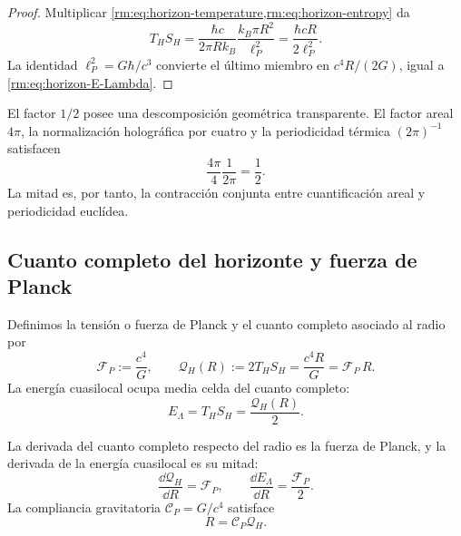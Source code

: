 \begin{proof}
Multiplicar \cref{rm:eq:horizon-temperature,rm:eq:horizon-entropy} da
\[
 T_HS_H
 =\frac{\hbar c}{2\pi Rk_B}
  \frac{k_B\pi R^2}{\ell_P^2}
 =\frac{\hbar cR}{2\ell_P^2}.
\]
La identidad \(\ell_P^2=G\hbar/c^3\) convierte el \'ultimo miembro en
\(c^4R/(2G)\), igual a \cref{rm:eq:horizon-E-Lambda}.
\end{proof}

El factor \(1/2\) posee una descomposici\'on geom\'etrica transparente. El
factor areal \(4\pi\), la normalizaci\'on hologr\'afica por cuatro y la
periodicidad t\'ermica \((2\pi)^{-1}\) satisfacen
\begin{equation}
 \frac{4\pi}{4}\frac1{2\pi}=\frac12.
 \label{rm:eq:horizon-half-factor}
\end{equation}
La mitad es, por tanto, la contracci\'on conjunta entre cuantificaci\'on
areal y periodicidad eucl\'idea.

\subsection{Cuanto completo del horizonte y fuerza de Planck}

Definimos la tensi\'on o fuerza de Planck y el cuanto completo asociado al
radio por
\begin{equation}
 \mathscr F_P:=\frac{c^4}{G},
 \qquad
 \boxed{
 \mathcal Q_H(R):=2T_HS_H
 =\frac{c^4R}{G}=\mathscr F_P\,R.}
 \label{rm:eq:horizon-full-quantum}
\end{equation}
La energ\'ia cuasilocal ocupa media celda del cuanto completo:
\begin{equation}
 \boxed{E_\Lambda=T_HS_H=\frac{\mathcal Q_H(R)}2.}
 \label{rm:eq:horizon-half-quantum-general}
\end{equation}

\begin{proposition}
\label{rm:prop:horizon-compliance}
La derivada del cuanto completo respecto del radio es la fuerza de Planck,
y la derivada de la energ\'ia cuasilocal es su mitad:
\begin{equation}
 \frac{\dd\mathcal Q_H}{\dd R}=\mathscr F_P,
 \qquad
 \frac{\dd E_\Lambda}{\dd R}=\frac{\mathscr F_P}{2}.
 \label{rm:eq:horizon-radial-derivatives}
\end{equation}
La compliancia gravitatoria \(\mathscr C_P=G/c^4\) satisface
\begin{equation}
 R=\mathscr C_P\mathcal Q_H.
 \label{rm:eq:horizon-compliance-law}
\end{equation}
\end{proposition}


